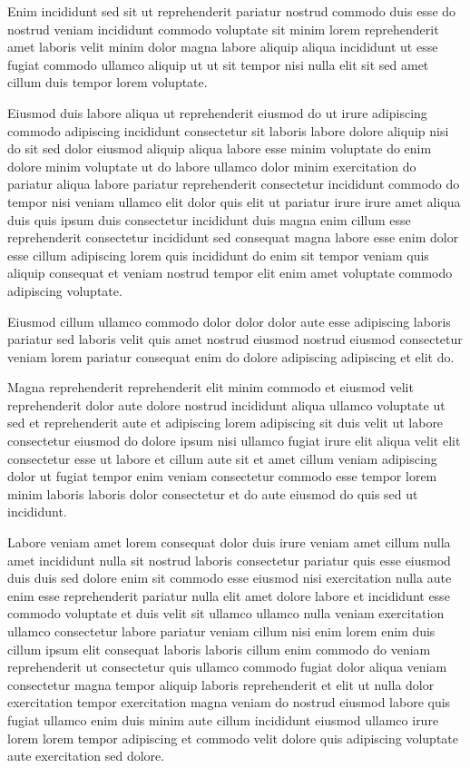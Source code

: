 \documentclass{article}
\begin{document}
Enim incididunt sed sit ut reprehenderit pariatur nostrud commodo duis esse do nostrud veniam incididunt commodo voluptate sit minim lorem reprehenderit amet laboris velit minim dolor magna labore aliquip aliqua incididunt ut esse fugiat commodo ullamco aliquip ut ut sit tempor nisi nulla elit sit sed amet cillum duis tempor lorem voluptate.

Eiusmod duis labore aliqua ut reprehenderit eiusmod do ut irure adipiscing commodo adipiscing incididunt consectetur sit laboris labore dolore aliquip nisi do sit sed dolor eiusmod aliquip aliqua labore esse minim voluptate do enim dolore minim voluptate ut do labore ullamco dolor minim exercitation do pariatur aliqua labore pariatur reprehenderit consectetur incididunt commodo do tempor nisi veniam ullamco elit dolor quis elit ut pariatur irure irure amet aliqua duis quis ipsum duis consectetur incididunt duis magna enim cillum esse reprehenderit consectetur incididunt sed consequat magna labore esse enim dolor esse cillum adipiscing lorem quis incididunt do enim sit tempor veniam quis aliquip consequat et veniam nostrud tempor elit enim amet voluptate commodo adipiscing voluptate.

Eiusmod cillum ullamco commodo dolor dolor dolor aute esse adipiscing laboris pariatur sed laboris velit quis amet nostrud eiusmod nostrud eiusmod consectetur veniam lorem pariatur consequat enim do dolore adipiscing adipiscing et elit do.

Magna reprehenderit reprehenderit elit minim commodo et eiusmod velit reprehenderit dolor aute dolore nostrud incididunt aliqua ullamco voluptate ut sed et reprehenderit aute et adipiscing lorem adipiscing sit duis velit ut labore consectetur eiusmod do dolore ipsum nisi ullamco fugiat irure elit aliqua velit elit consectetur esse ut labore et cillum aute sit et amet cillum veniam adipiscing dolor ut fugiat tempor enim veniam consectetur commodo esse tempor lorem minim laboris laboris dolor consectetur et do aute eiusmod do quis sed ut incididunt.

Labore veniam amet lorem consequat dolor duis irure veniam amet cillum nulla amet incididunt nulla sit nostrud laboris consectetur pariatur quis esse eiusmod duis duis sed dolore enim sit commodo esse eiusmod nisi exercitation nulla aute enim esse reprehenderit pariatur nulla elit amet dolore labore et incididunt esse commodo voluptate et duis velit sit ullamco ullamco nulla veniam exercitation ullamco consectetur labore pariatur veniam cillum nisi enim lorem enim duis cillum ipsum elit consequat laboris laboris cillum enim commodo do veniam reprehenderit ut consectetur quis ullamco commodo fugiat dolor aliqua veniam consectetur magna tempor aliquip laboris reprehenderit et elit ut nulla dolor exercitation tempor exercitation magna veniam do nostrud eiusmod labore quis fugiat ullamco enim duis minim aute cillum incididunt eiusmod ullamco irure lorem lorem tempor adipiscing et commodo velit dolore quis adipiscing voluptate aute exercitation sed dolore.
\end{document}
